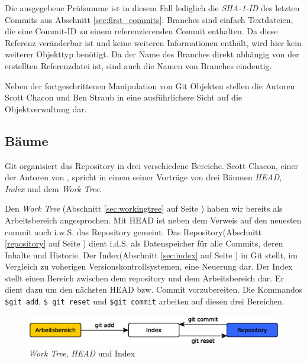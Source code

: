 Die ausgegebene Prüfsumme ist in diesem Fall lediglich die \textit{SHA-1-ID} des
letzten Commits aus Abschnitt \ref{sec:first_commits}. Branches sind einfach
Textdateien, die eine Commit-ID zu einem referenzierenden Commit enthalten. Da
diese Referenz veränderbar ist und keine weiteren Informationen enthält, wird
hier kein weiterer Objekttyp benötigt. Da der Name des Branches direkt abhängig
von der erstellten Referenzdatei ist, sind auch die Namen von Branches
eindeutig.

Neben der fortgeschrittenen Manipulation von Git Objekten stellen die Autoren
Scott Chacon und Ben Straub in \cite[S.~408-418]{progit} eine ausführlichere
Sicht auf die Objektverwaltung dar.

\subsection{Bäume}\label{sec:trees}
Git organisiert das Repository in drei verschiedene Bereiche. Scott Chacon,
einer der Autoren von \cite{progit}, spricht in einem seiner
Vorträge\cite{link:talesoftrees} von drei Bäumen \textit{HEAD}, \textit{Index}
und dem \textit{Work Tree}.

Den \textit{Work Tree} (Abschnitt \ref{sec:workingtree} auf Seite
\pageref{sec:workingtree}) haben wir bereits als Arbeitsbereich angesprochen.
Mit \gls{HEAD} ist neben dem Verweis auf den neuesten commit auch i.w.S. das
Repository gemeint.  Das Repository(Abschnitt \ref{repository} auf Seite
\pageref{repository}) dient i.d.S. als Datenspeicher für alle Commits, deren
Inhalte und Historie. Der Index(Abschnitt \ref{sec:index} auf Seite
\pageref{sec:index}) in Git stellt, im Vergleich zu voherigen
Versionskontrollsystemen, eine Neuerung dar. Der Index stellt einen Bereich
zwischen dem \gls{repository} und dem Arbeitsbereich dar. Er dient dazu um den
nächsten \gls{HEAD} bzw. Commit vorzubereiten. Die Kommandos \texttt{\$git
add}, \texttt{\$ git reset} und \texttt{\$git commit} arbeiten auf diesen drei
Bereichen.\cite[34-35]{gitosp}

\begin{figure}[h]
    \centering
    \includegraphics[scale=0.60]{images/trees.eps}
    \caption{\textit{Work Tree}, \textit{HEAD} und Index\cite[34]{gitosp}}
    \label{fig:trees}
\end{figure}

